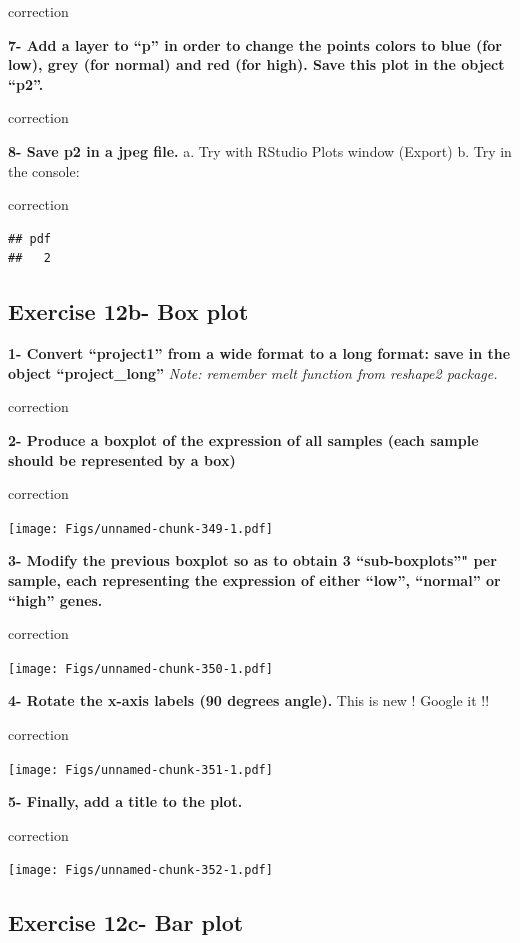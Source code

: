 \documentclass[]{book}
\begin{document}
correction

\textbf{7- Add a layer to ``p'' in order to change the points colors to blue (for low), grey (for normal) and red (for high). Save this plot in the object ``p2''.}

correction

\textbf{8- Save p2 in a jpeg file.}
a. Try with RStudio Plots window (Export)
b. Try in the console:

correction

\begin{verbatim}
## pdf 
##   2
\end{verbatim}

\hypertarget{exercise-12b--box-plot}{%
\subsection{Exercise 12b- Box plot}\label{exercise-12b--box-plot}}

\textbf{1- Convert ``project1'' from a wide format to a long format: save in the object ``project\_long''}
\emph{Note: remember melt function from reshape2 package.}

correction

\textbf{2- Produce a boxplot of the expression of all samples (each sample should be represented by a box)}

correction

\texttt{[image: Figs/unnamed-chunk-349-1.pdf]}

\textbf{3- Modify the previous boxplot so as to obtain 3 ``sub-boxplots''" per sample, each representing the expression of either ``low'', ``normal'' or ``high'' genes.}

correction

\texttt{[image: Figs/unnamed-chunk-350-1.pdf]}

\textbf{4- Rotate the x-axis labels (90 degrees angle).}
This is new ! Google it !!

correction

\texttt{[image: Figs/unnamed-chunk-351-1.pdf]}

\textbf{5- Finally, add a title to the plot.}

correction

\texttt{[image: Figs/unnamed-chunk-352-1.pdf]}

\hypertarget{exercise-12c--bar-plot}{%
\subsection{Exercise 12c- Bar plot}\label{exercise-12c--bar-plot}}
\end{document}
